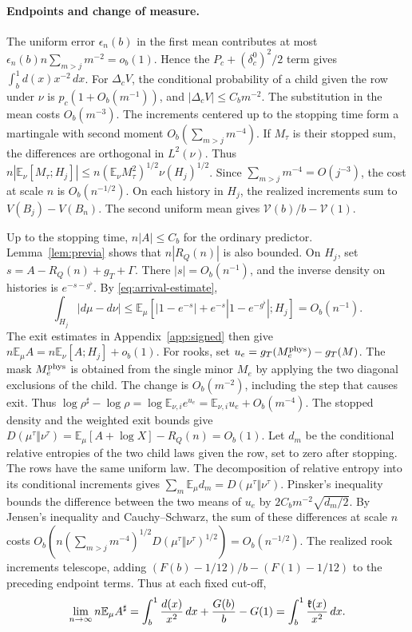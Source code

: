 \paragraph{Endpoints and change of measure.} The uniform error \(\epsilon_n(b)\) in the first mean
contributes at most \(\epsilon_n(b)n\sum_{m>j}m^{-2}=o_b(1)\). Hence the \(P_c+(\delta_c^0)^2/2\) term
gives \(\int_b^1d(x)x^{-2}\,dx\). For \(\Delta_cV\), the conditional probability of a child given the row
under \(\nu\) is \(p_c(1+O_b(m^{-1}))\), and \(|\Delta_cV|\le C_bm^{-2}\). The substitution in the mean
costs \(O_b(m^{-3})\). The increments centered up to the stopping time form a martingale with second
moment \(O_b(\sum_{m>j}m^{-4})\). If \(M_\tau\) is their stopped sum, the differences are orthogonal in
\(L^2(\nu)\). Thus \(n|\mathbb E_\nu[M_\tau;H_j]|\le n(\mathbb E_\nu M_\tau^2)^{1/2}\nu(H_j)^{1/2}\).
Since \(\sum_{m>j}m^{-4}=O(j^{-3})\), the cost at scale \(n\) is \(O_b(n^{-1/2})\). On each history in
\(H_j\), the realized increments sum to \(V(B_j)-V(B_n)\). The second uniform mean gives \(\mathcal
V(b)/b-\mathcal V(1)\).

Up to the stopping time, \(n|A|\le C_b\) for the ordinary predictor. Lemma~\ref{lem:previa} shows that
\(n|R_Q(n)|\) is also bounded. On \(H_j\), set \(s=A-R_Q(n)+g_T+\Gamma\). There \(|s|=O_b(n^{-1})\), and
the inverse density on histories is \(e^{-s-g^\flat}\). By \eqref{eq:arrival-estimate}, \[
 \int_{H_j}|d\mu-d\nu|
 \le\mathbb E_\mu[|1-e^{-s}|+e^{-s}|1-e^{-g^\flat}|;H_j]=O_b(n^{-1}) .
\] The exit estimates in Appendix~\ref{app:signed} then give \(n\mathbb E_\mu A=n\mathbb
E_\nu[A;H_j]+o_b(1)\). For rooks, set \(u_e=g_T(M_e^{\rm phys})-g_T(M)\). The mask \(M_e^{\rm phys}\) is
obtained from the single minor \(M_e\) by applying the two diagonal exclusions of the child. The change
is \(O_b(m^{-2})\), including the step that causes exit. Thus \(\log\rho^\sharp-\log\rho=\log\mathbb
E_{\nu,i}e^{u_e}
 =\mathbb E_{\nu,i}u_e+O_b(m^{-4})\). The stopped density and the weighted exit bounds give
\(D(\mu^\tau\Vert\nu^\tau)=\mathbb E_\mu[A+\log X]-R_Q(n)=O_b(1)\). Let \(d_m\) be the conditional
relative entropies of the two child laws given the row, set to zero after stopping. The rows have the
same uniform law. The decomposition of relative entropy into its conditional increments gives
\(\sum_m\mathbb E_\mu
d_m=D(\mu^\tau\Vert\nu^\tau)\). Pinsker's inequality~\cite{ct} bounds the difference between the two
means of
\(u_e\) by \(2C_bm^{-2}\sqrt{d_m/2}\). By Jensen's inequality and Cauchy--Schwarz, the sum of these
differences at scale \(n\) costs
\(O_b(n(\sum_{m>j}m^{-4})^{1/2}D(\mu^\tau\Vert\nu^\tau)^{1/2})=O_b(n^{-1/2})\). The realized rook
increments telescope, adding \((F(b)-1/12)/b-(F(1)-1/12)\) to the preceding endpoint terms. Thus at each
fixed cut-off, \[
 \lim_{n\to\infty} n\mathbb E_\mu A^\sharp
 =\int_b^1\frac{d(x)}{x^2}\,dx+\frac{G(b)}b-G(1)
 =\int_b^1\frac{\mathfrak{k}(x)}{x^2}\,dx .
\]
